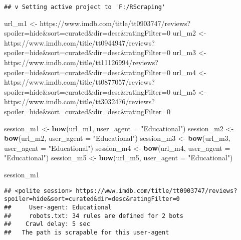 \documentclass[
]{article}
\newenvironment{Shaded}{\begin{snugshade}}{\end{snugshade}}
\newcommand{\AttributeTok}[1]{\textcolor[rgb]{0.13,0.29,0.53}{#1}}
\newcommand{\FunctionTok}[1]{\textcolor[rgb]{0.13,0.29,0.53}{\textbf{#1}}}
\newcommand{\NormalTok}[1]{#1}
\newcommand{\OtherTok}[1]{\textcolor[rgb]{0.56,0.35,0.01}{#1}}
\newcommand{\StringTok}[1]{\textcolor[rgb]{0.31,0.60,0.02}{#1}}
\begin{document}
\begin{verbatim}
## v Setting active project to 'F:/RScraping'
\end{verbatim}

\begin{Shaded}
\begin{Highlighting}[]
\NormalTok{url\_m1 }\OtherTok{\textless{}{-}} \StringTok{\textquotesingle{}https://www.imdb.com/title/tt0903747/reviews?spoiler=hide\&sort=curated\&dir=desc\&ratingFilter=0\textquotesingle{}}
\NormalTok{url\_m2 }\OtherTok{\textless{}{-}} \StringTok{\textquotesingle{}https://www.imdb.com/title/tt0944947/reviews?spoiler=hide\&sort=curated\&dir=desc\&ratingFilter=0\textquotesingle{}}
\NormalTok{url\_m3 }\OtherTok{\textless{}{-}} \StringTok{\textquotesingle{}https://www.imdb.com/title/tt11126994/reviews?spoiler=hide\&sort=curated\&dir=desc\&ratingFilter=0\textquotesingle{}}
\NormalTok{url\_m4 }\OtherTok{\textless{}{-}} \StringTok{\textquotesingle{}https://www.imdb.com/title/tt0877057/reviews?spoiler=hide\&sort=curated\&dir=desc\&ratingFilter=0\textquotesingle{}}
\NormalTok{url\_m5 }\OtherTok{\textless{}{-}} \StringTok{\textquotesingle{}https://www.imdb.com/title/tt3032476/reviews?spoiler=hide\&sort=curated\&dir=desc\&ratingFilter=0\textquotesingle{}}



\NormalTok{session\_m1 }\OtherTok{\textless{}{-}} \FunctionTok{bow}\NormalTok{(url\_m1,}
                  \AttributeTok{user\_agent =} \StringTok{"Educational"}\NormalTok{)}
\NormalTok{session\_m2 }\OtherTok{\textless{}{-}} \FunctionTok{bow}\NormalTok{(url\_m2,}
                  \AttributeTok{user\_agent =} \StringTok{"Educational"}\NormalTok{)}
\NormalTok{session\_m3 }\OtherTok{\textless{}{-}} \FunctionTok{bow}\NormalTok{(url\_m3,}
                  \AttributeTok{user\_agent =} \StringTok{"Educational"}\NormalTok{)}
\NormalTok{session\_m4 }\OtherTok{\textless{}{-}} \FunctionTok{bow}\NormalTok{(url\_m4,}
                  \AttributeTok{user\_agent =} \StringTok{"Educational"}\NormalTok{)}
\NormalTok{session\_m5 }\OtherTok{\textless{}{-}} \FunctionTok{bow}\NormalTok{(url\_m5,}
                  \AttributeTok{user\_agent =} \StringTok{"Educational"}\NormalTok{)}

\NormalTok{session\_m1}
\end{Highlighting}
\end{Shaded}

\begin{verbatim}
## <polite session> https://www.imdb.com/title/tt0903747/reviews?spoiler=hide&sort=curated&dir=desc&ratingFilter=0
##     User-agent: Educational
##     robots.txt: 34 rules are defined for 2 bots
##    Crawl delay: 5 sec
##   The path is scrapable for this user-agent
\end{verbatim}
\end{document}
